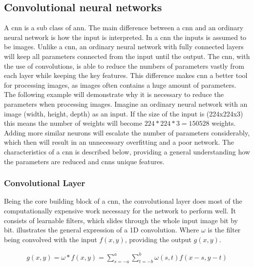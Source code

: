 \documentclass[USenglish]{ifimaster}  %
\begin{document}
\subsection{Convolutional neural networks}
A \ac{cnn} is a sub class of \ac{ann}. The main difference between a \ac{cnn} and an ordinary neural network is how the input is interpreted. In a \ac{cnn} the inputs is assumed to be images. 
\newline
\newline
Unlike a \ac{cnn}, an ordinary neural network with fully connected layers will keep all parameters connected from the input until the output. The \ac{cnn}, with the use of convolutions, is able to reduce the numbers of parameters vastly from each layer while keeping the key features. This difference makes \ac{cnn} a better tool for processing images, as images often contains a huge amount of parameters. 
\newline
\newline
The following example will demonstrate why it is necessary to reduce the parameters when processing images. Imagine an ordinary neural network with an image (width, height, depth) as an input. If the size of the input is (224x224x3) this means the number of weights will become $224 * 224 * 3 = 150528$ weights. Adding more similar neurons will escalate the number of parameters considerably, which then will result in an unnecessary overfitting and a poor network.
\newline
\newline
The characteristics of a \ac{cnn} is described below, providing a general understanding how the parameters are reduced and \acp{cnn} unique features.

\subsubsection{Convolutional Layer}
Being the core building block of a \ac{cnn}, the convolutional layer does most of the computationally expensive work necessary for the network to perform well. It consists of learnable filters, which slides through the whole input image bit by bit.  illustrates the general expression of a 1D convolution. Where $\omega$ is the filter being convolved with the input $f(x,y)$, providing the output $g(x,y)$. 

\begin{equation}\label{eq:conv}
\begin{aligned}
g(x,y) = \omega * f(x,y) = \sum_{s=-a}^{a}\sum_{t=-b}^{b}\omega(s,t)f(x-s,y-t)
\end{aligned}
\end{equation}
\end{document}
